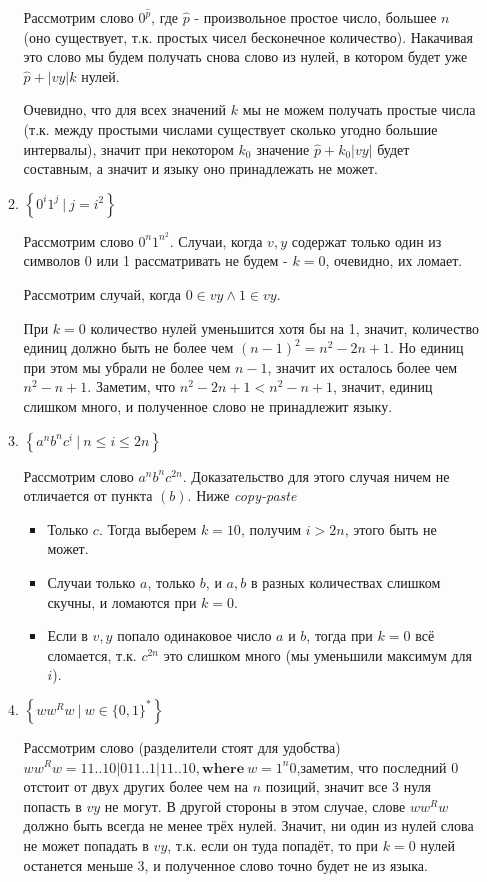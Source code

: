\documentclass[fleqn]{article}
\begin{document}
\begin{enumerate}
\begin{enumerate}
		Рассмотрим слово $0^{\hat{p}}$, где $\hat{p}$ - произвольное простое число, большее $n$ (оно существует, т.к. 
		простых чисел бесконечное количество). Накачивая это слово мы будем получать снова слово из нулей, в котором 
		будет уже $\hat{p} + |vy|k$ нулей. 
		
		Очевидно, что для всех значений $k$ мы не можем получать простые числа 
		(т.к. между простыми числами существует сколько угодно большие интервалы), значит при некотором $k_0$ значение 
		$\hat{p} + k_0|vy|$ будет составным, а значит и языку оно принадлежать не может.
		\item $\left\{ 0^i 1^j     \ | \ j = i^2 \right\}$
		
		Рассмотрим слово $0^n 1^{n^2}$. Случаи, когда $v, y$ содержат только один из символов 0 или 1 рассматривать не 
		будем - $k = 0$, очевидно, их ломает. 
		
		Рассмотрим случай, когда $0 \in vy\land 1 \in vy$.
		
		При $k = 0$ количество нулей уменьшится хотя бы на 1, значит, количество единиц должно быть не более чем $(n 
		- 1)^ 2 = n ^ 2 - 2n + 1$. Но единиц при этом мы убрали не более чем $n - 1$, значит их осталось более чем 
		$n^2 - n + 1$. Заметим, что $n ^ 2 - 2n + 1 < n^2 - n + 1$, значит, единиц слишком много, и полученное слово 
		не принадлежит языку.
		\item $\left\{ a^n b^n c^i \ | \ n \leq i \leq 2n \right\}$
		
		Рассмотрим слово $a^n b^n c^{2n}$. Доказательство для этого случая ничем не отличается от пункта $(b)$. Ниже \textit{copy-paste}
		\begin{itemize}
			\item Только $c$. Тогда выберем $k = 10$, получим $i > 2n$, этого быть не может.
			\item Случаи только $a$, только $b$, и $a, b$ в разных количествах слишком скучны, и ломаются при $k = 0$.
			\item Если в $v, y$ попало одинаковое число $a$ и $b$, тогда при $k = 0$ всё сломается, т.к. $c^{2n}$ это 
			слишком много (мы уменьшили максимум для $i$).
		\end{itemize}
		
		\item $\left\{ ww^Rw       \ | \ w \in \{0, 1\}^* \right\}$
		
		Рассмотрим слово (разделители стоят для удобства) $ww^Rw = 11..10|011..1|11..10, \mathbf{where} \ w = 
		1^n0$,заметим, что последний 0 отстоит от двух других более чем на $n$ позиций, значит все 3 нуля попасть в 
		$vy$ не могут. В другой стороны в этом случае, слове $ww^Rw$ должно быть всегда не менее трёх нулей. Значит, 
		ни один из нулей слова не может попадать в $vy$, т.к. если он туда попадёт, то при $k = 0$ нулей останется 
		меньше 3, и полученное слово точно будет не из языка.
		

\end{enumerate}
\end{enumerate}
\end{document}
